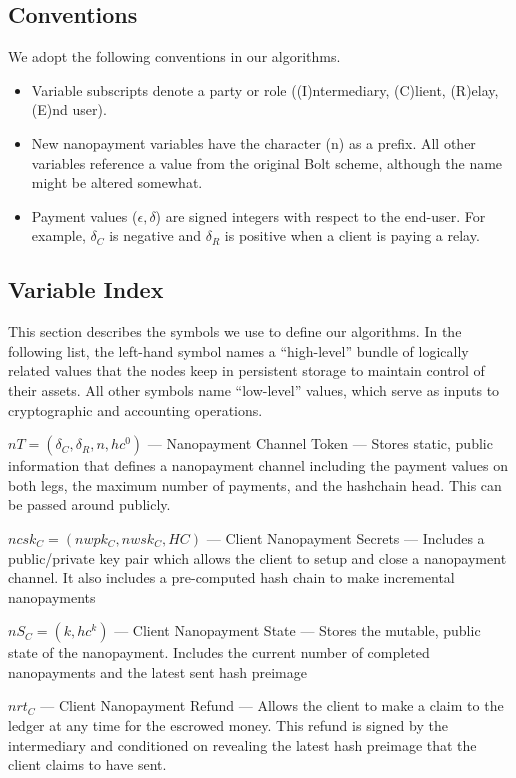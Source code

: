 \subsection{Conventions}

We adopt the following conventions in our algorithms.

\begin{itemize}
\item Variable subscripts denote a party or role ((I)ntermediary, (C)lient, (R)elay, (E)nd user).
\item New nanopayment variables have the character (n) as a prefix.
  All other variables reference a value from the original Bolt scheme, although the name might be altered somewhat.
\item Payment values ($\epsilon, \delta$) are signed integers with respect to the end-user.
  For example, $\delta_C$ is negative and $\delta_R$ is positive when a client is paying a relay.
\end{itemize}

\subsection{Variable Index}

This section describes the symbols we use to define our algorithms.
In the following list, the left-hand symbol names a ``high-level'' bundle of logically related values that the nodes keep in persistent storage to maintain control of their assets.
All other symbols name ``low-level'' values, which serve as inputs to cryptographic and accounting operations.

$nT = (\delta_C, \delta_R, n, hc^0)$ --- Nanopayment Channel Token --- Stores static, public information that defines a nanopayment channel including the payment values on both legs, the maximum number of payments, and the hashchain head.
This can be passed around publicly.

$ncsk_C = (nwpk_C, nwsk_C, HC)$ --- Client Nanopayment Secrets --- Includes a public/private key pair which allows the client to setup and close a nanopayment channel.
It also includes a pre-computed hash chain to make incremental nanopayments

$nS_C = (k, hc^k)$ --- Client Nanopayment State --- Stores the mutable, public state of the nanopayment.
Includes the current number of completed nanopayments and the latest sent hash preimage

$nrt_C$ --- Client Nanopayment Refund --- Allows the client to make a claim to the ledger at any time for the escrowed money.
This refund is signed by the intermediary and conditioned on revealing the latest hash preimage that the client claims to have sent.

